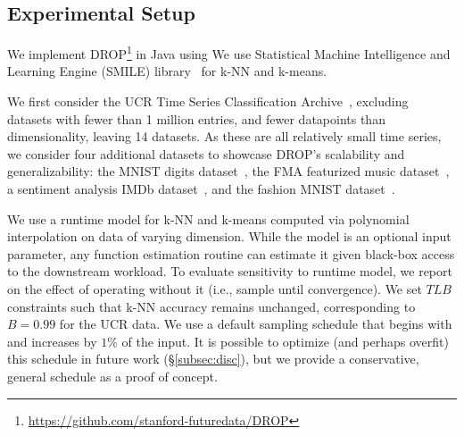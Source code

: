 \subsection{Experimental Setup}
\label{subsec:setup}
 We implement DROP\footnote{\href{https://github.com/stanford-futuredata/DROP}{https://github.com/stanford-futuredata/DROP}} in Java using 
We use  Statistical Machine Intelligence and Learning Engine (SMILE) library~\cite{smile} for k-NN {and k-means}. 

We first consider the UCR Time Series Classification Archive~\cite{ucr}, excluding datasets with fewer than 1 million entries, and fewer datapoints than dimensionality, leaving 14 datasets. 
As these are all relatively small time series, we consider four additional datasets to showcase DROP's scalability and generalizability: the MNIST digits dataset~\cite{mnist}, the FMA featurized music dataset~\cite{fma}, a sentiment analysis IMDb dataset~\cite{imdb}, and the fashion MNIST dataset~\cite{fashion}. 

 We use a runtime model for k-NN and k-means computed via polynomial interpolation on data of varying dimension.
While the model is an optional input parameter, any function estimation routine can estimate it given black-box access to the downstream workload.
To evaluate sensitivity to runtime model, we report on the effect of operating without it (i.e., sample until convergence).
We set $TLB$ constraints such that k-NN accuracy remains unchanged, corresponding to $B = 0.99$  for the UCR data.
We use a default sampling schedule that begins with and increases by $1\%$ of the input.
It is possible to optimize (and perhaps overfit) this schedule in future work (\S\ref{subsec:disc}), but we provide a conservative, general schedule as a proof of concept.


